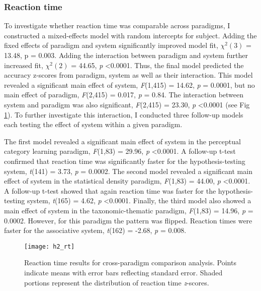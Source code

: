 \documentclass[../dissertation.tex]{subfiles}
\begin{document}
\subsubsection{Reaction time}
To investigate whether reaction time was comparable across paradigms, I constructed a mixed-effects model with random intercepts for subject. Adding the fixed effects of paradigm and system significantly improved model fit,  $\chi^{2}(3)$ = 13.48, p = 0.003. Adding the interaction between paradigm and system further increased fit,  $\chi^{2}(2)$  = 44.65, \textit{p} \textless 0.0001. Thus, the final model predicted the accuracy z-scores from paradigm, system as well as their interaction. This model revealed a significant main effect of system, \textit{F}(1,415) = 14.62, \textit{p} = 0.0001, but no main effect of paradigm, \textit{F}(2,415) = 0.017, \textit{p} = 0.84. The interaction between system and paradigm was also significant, \textit{F}(2,415) = 23.30, \textit{p} \textless 0.0001 (see Fig \ref{h2_rt}). To further investigate this interaction, I conducted three follow-up models each testing the effect of system within a given paradigm. \par
	The first model revealed a significant main effect of system in the perceptual category learning paradigm, \textit{F}(1,83) = 29.96, \textit{p} \textless 0.0001. A follow-up t-test confirmed that reaction time was significantly faster for the hypothesis-testing system, \textit{t}(141) = 3.73, \textit{p} = 0.0002. The second model revealed a significant main effect of system in the statistical density paradigm, \textit{F}(1,83) = 44.00, \textit{p} \textless 0.0001. A follow-up t-test showed that again reaction time was faster for the hypothesis-testing system, \textit{t}(165) = 4.62, \textit{p} \textless 0.0001.  Finally, the third model also showed a main effect of system in the taxonomic-thematic paradigm, \textit{F}(1,83) = 14.96, \textit{p} = 0.0002. However, for this paradigm the pattern was flipped. Reaction times were faster for the associative system, \textit{t}(162) = -2.68, \textit{p} = 0.008.
	
\begin{figure}[h]
\begin{center}
\texttt{[image: h2\_rt]}
\caption[Reaction time results for cross-paradigm comparison]{Reaction time results for cross-paradigm comparison analysis. Points indicate means with error bars reflecting standard error. Shaded portions represent the distribution of reaction time \textit{z}-scores.}
\vspace{-20pt}
\label{h2_rt}
\end{center}
\end{figure}		
	
\end{document}
